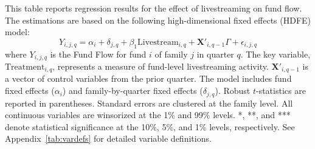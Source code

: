 \begin{table}[!ht]
    \centering
    
    \caption{Dynamic Livestream Effect on Fund Flow (HDFE)}\label{tab:fund_hdfe}
    
    \begin{minipage}{0.95\textwidth}
        \footnotesize
        This table reports regression results for the effect of livestreaming on fund flow. The estimations are based on the following high-dimensional fixed effects (HDFE) model:
        \begin{equation*}
            Y_{i,j,q} = \alpha_i + \delta_{j,q} + \beta_1 \text{Livestream}_{i,q} + \mathbf{X}'_{i,q-1} \Gamma + \epsilon_{i,j,q}
        \end{equation*}
        where $Y_{i,j,q}$ is the Fund Flow for fund $i$ of family $j$ in quarter $q$. The key variable, $\text{Treatment}_{i,q}$, represents a measure of fund-level livestreaming activity. $\mathbf{X}'_{i,q-1}$ is a vector of control variables from the prior quarter. The model includes fund fixed effects ($\alpha_i$) and family-by-quarter fixed effects ($\delta_{j,q}$). Robust $t$-statistics are reported in parentheses. Standard errors are clustered at the family level. All continuous variables are winsorized at the 1\% and 99\% levels. *, **, and *** denote statistical significance at the 10\%, 5\%, and 1\% levels, respectively. See Appendix~\ref{tab:vardefs} for detailed variable definitions.
    \end{minipage}

    \vspace{2mm}
    
    {
    \fontsize{12}{13}\selectfont
     
    }
    
\end{table}